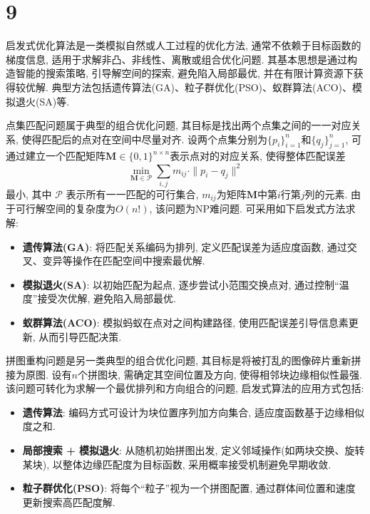 \section*{9}

启发式优化算法是一类模拟自然或人工过程的优化方法, 通常不依赖于目标函数的梯度信息, 适用于求解非凸、非线性、离散或组合优化问题.
其基本思想是通过构造智能的搜索策略, 引导解空间的探索, 避免陷入局部最优, 并在有限计算资源下获得较优解.
典型方法包括遗传算法(GA)、粒子群优化(PSO)、蚁群算法(ACO)、模拟退火(SA)等.

点集匹配问题属于典型的组合优化问题, 其目标是找出两个点集之间的一一对应关系, 使得匹配后的点对在空间中尽量对齐.
设两个点集分别为$\{p_i\}_{i=1}^n$和$\{q_j\}_{j=1}^n$, 可通过建立一个匹配矩阵$\bm{M} \in \{0,1\}^{n\times n}$表示点对的对应关系, 使得整体匹配误差
\begin{equation*}
    \min_{\bm{M}\in\mathcal{P}}\sum_{i,j}m_{ij}\cdot\|p_i - q_j\|^2
\end{equation*}
最小, 其中 $\mathcal{P}$ 表示所有一一匹配的可行集合, $m_{ij}$为矩阵$\bm{M}$中第$i$行第$j$列的元素.
由于可行解空间的复杂度为$O(n!)$, 该问题为NP难问题.
可采用如下启发式方法求解:
\begin{itemize}
  \item \textbf{遗传算法(GA)}: 将匹配关系编码为排列, 定义匹配误差为适应度函数, 通过交叉、变异等操作在匹配空间中搜索最优解.
  \item \textbf{模拟退火(SA)}: 以初始匹配为起点, 逐步尝试小范围交换点对, 通过控制“温度”接受次优解, 避免陷入局部最优.
  \item \textbf{蚁群算法(ACO)}: 模拟蚂蚁在点对之间构建路径, 使用匹配误差引导信息素更新, 从而引导匹配决策.
\end{itemize}

拼图重构问题是另一类典型的组合优化问题, 其目标是将被打乱的图像碎片重新拼接为原图.
设有$n$个拼图块, 需确定其空间位置及方向, 使得相邻块边缘相似性最强.
该问题可转化为求解一个最优排列和方向组合的问题, 启发式算法的应用方式包括:

\begin{itemize}
  \item \textbf{遗传算法}: 编码方式可设计为块位置序列加方向集合, 适应度函数基于边缘相似度之和.
  \item \textbf{局部搜索 + 模拟退火}: 从随机初始拼图出发, 定义邻域操作(如两块交换、旋转某块), 以整体边缘匹配度为目标函数, 采用概率接受机制避免早期收敛.
  \item \textbf{粒子群优化(PSO)}: 将每个“粒子”视为一个拼图配置, 通过群体间位置和速度更新搜索高匹配度解.
\end{itemize}
